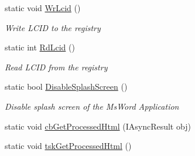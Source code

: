 \begin{DoxyCompactItemize}
static void \hyperlink{class_e_u_cases_1_1_e_u_links_checker_word_add_in_1_1_e_u_links_checker_add_in_a78886427eb4e00b07b25b61ad82ba80e}{Wr\+Lcid} ()
\begin{DoxyCompactList}\small\item\em Write L\+C\+I\+D to the registry \end{DoxyCompactList}\item 
static int \hyperlink{class_e_u_cases_1_1_e_u_links_checker_word_add_in_1_1_e_u_links_checker_add_in_a69d77593a2a9803c1b8cbea399a8f344}{Rd\+Lcid} ()
\begin{DoxyCompactList}\small\item\em Read L\+C\+I\+D from the registry \end{DoxyCompactList}\item 
static bool \hyperlink{class_e_u_cases_1_1_e_u_links_checker_word_add_in_1_1_e_u_links_checker_add_in_a02e52e397a4708d4ae9a86e729bfca2f}{Disable\+Splash\+Screen} ()
\begin{DoxyCompactList}\small\item\em Disable splash screen of the Ms\+Word Application \end{DoxyCompactList}\item 
static void \hyperlink{class_e_u_cases_1_1_e_u_links_checker_word_add_in_1_1_e_u_links_checker_add_in_a6fe947f58738a2346fa1061bb35c9a02}{cb\+Get\+Processed\+Html} (I\+Async\+Result obj)
\item 
static void \hyperlink{class_e_u_cases_1_1_e_u_links_checker_word_add_in_1_1_e_u_links_checker_add_in_adcf16c6914a904020777a9691528081d}{tsk\+Get\+Processed\+Html} ()
\end{DoxyCompactItemize}
